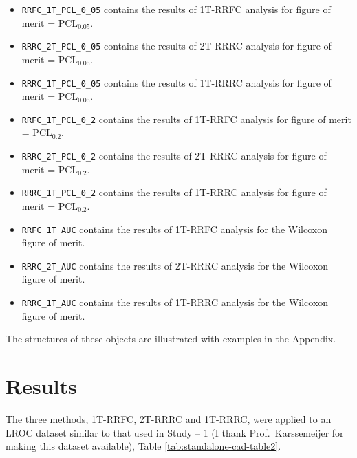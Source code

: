 \documentclass[
]{book}
\begin{document}
\begin{itemize}
\item
  \texttt{RRFC\_1T\_PCL\_0\_05} contains the results of 1T-RRFC analysis for figure of merit = \(\text{PCL}_{0.05}\).
\item
  \texttt{RRRC\_2T\_PCL\_0\_05} contains the results of 2T-RRRC analysis for figure of merit = \(\text{PCL}_{0.05}\).
\item
  \texttt{RRRC\_1T\_PCL\_0\_05} contains the results of 1T-RRRC analysis for figure of merit = \(\text{PCL}_{0.05}\).
\item
  \texttt{RRFC\_1T\_PCL\_0\_2} contains the results of 1T-RRFC analysis for figure of merit = \(\text{PCL}_{0.2}\).
\item
  \texttt{RRRC\_2T\_PCL\_0\_2} contains the results of 2T-RRRC analysis for figure of merit = \(\text{PCL}_{0.2}\).
\item
  \texttt{RRRC\_1T\_PCL\_0\_2} contains the results of 1T-RRRC analysis for figure of merit = \(\text{PCL}_{0.2}\).
\item
  \texttt{RRFC\_1T\_AUC} contains the results of 1T-RRFC analysis for the Wilcoxon figure of merit.
\item
  \texttt{RRRC\_2T\_AUC} contains the results of 2T-RRRC analysis for the Wilcoxon figure of merit.
\item
  \texttt{RRRC\_1T\_AUC} contains the results of 1T-RRRC analysis for the Wilcoxon figure of merit.
\end{itemize}

The structures of these objects are illustrated with examples in the Appendix.

\hypertarget{standalone-cad-radiologists-results}{%
\section{Results}\label{standalone-cad-radiologists-results}}

The three methods, 1T-RRFC, 2T-RRRC and 1T-RRRC, were applied to an LROC dataset similar to that used in Study -- 1 (I thank Prof.~Karssemeijer for making this dataset available), Table \ref{tab:standalone-cad-table2}.
\end{document}
